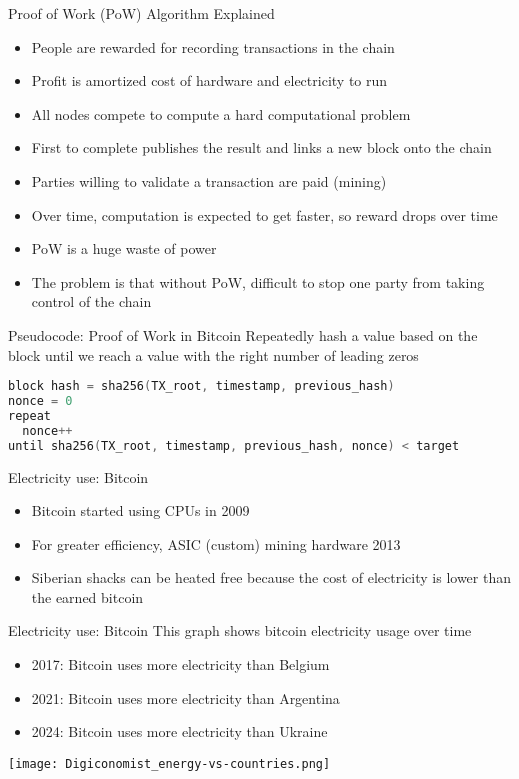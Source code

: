\begin{frame}{Proof of Work (PoW) Algorithm Explained}
    \begin{itemize}
        \item People are rewarded for recording transactions in the chain
        \item Profit is amortized cost of hardware and electricity to run
        \item All nodes compete to compute a hard computational problem
        \item First to complete publishes the result and links a new block onto the chain
        \item Parties willing to validate a transaction are paid (mining)
        \item Over time, computation is expected to get faster, so reward drops over time
        \item PoW is a huge waste of power
        \item The problem is that without PoW, difficult to stop one party from taking control of the chain
    \end{itemize}
\end{frame}

\begin{frame}[fragile]{Pseudocode: Proof of Work in Bitcoin}
    Repeatedly hash a value based on the block until we reach a value with the right number of leading zeros
\begin{lstlisting}[language=c++]
block hash = sha256(TX_root, timestamp, previous_hash)
nonce = 0
repeat
  nonce++
until sha256(TX_root, timestamp, previous_hash, nonce) < target
\end{lstlisting}
\end{frame}

\begin{frame}{Electricity use: Bitcoin}
    \begin{itemize}
        \item Bitcoin started using CPUs in 2009
        \item For greater efficiency, ASIC (custom) mining hardware 2013
        \item Siberian shacks can be heated free because the cost of electricity is lower than the earned bitcoin
    \end{itemize}
\end{frame}

\begin{frame}{Electricity use: Bitcoin}
This graph shows bitcoin electricity usage over time
\begin{itemize}
    \item 2017: Bitcoin uses more electricity than Belgium
    \item 2021: Bitcoin uses more electricity than Argentina
    \item 2024: Bitcoin uses more electricity than Ukraine
\end{itemize} 
\texttt{[image: Digiconomist\_energy-vs-countries.png]}
\end{frame}


